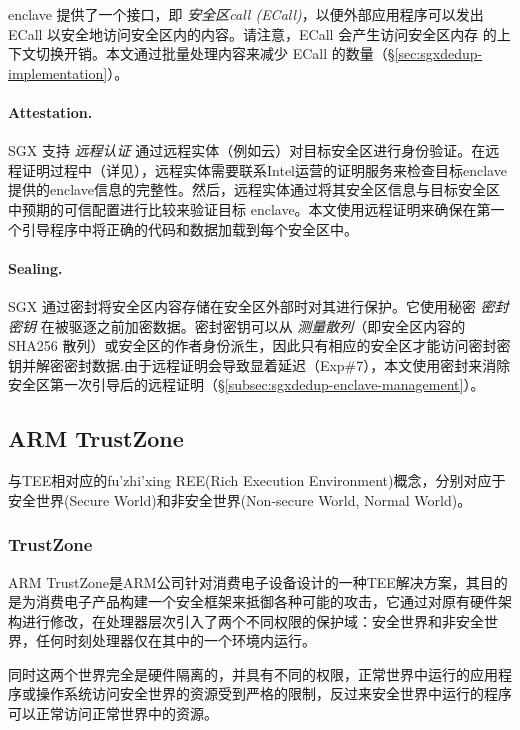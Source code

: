 enclave 提供了一个接口，即 \textit{安全区call (ECall)}，以便外部应用程序可以发出 ECall 以安全地访问安全区内的内容。请注意，ECall 会产生访问安全区内存 \cite{harnik18} 的上下文切换开销。本文通过批量处理内容来减少 ECall 的数量（\S\ref{sec:sgxdedup-implementation}）。

\paragraph*{Attestation.} SGX 支持 \textit{ 远程认证} 通过远程实体（例如云）对目标安全区进行身份验证。在远程证明过程中（详见\cite{sgx}），远程实体需要联系Intel运营的证明服务来检查目标enclave提供的enclave信息的完整性。然后，远程实体通过将其安全区信息与目标安全区中预期的可信配置进行比较来验证目标 enclave。本文使用远程证明来确保在第一个引导程序中将正确的代码和数据加载到每个安全区中。

\paragraph*{Sealing.} SGX 通过密封将安全区内容存储在安全区外部时对其进行保护。它使用秘密 \textit{ 密封密钥} 在被驱逐之前加密数据。密封密钥可以从 \textit{ 测量散列}（即安全区内容的 SHA256 散列）或安全区的作者身份派生，因此只有相应的安全区才能访问密封密钥并解密密封数据.由于远程证明会导致显着延迟（Exp\#7），本文使用密封来消除安全区第一次引导后的远程证明（\S\ref{subsec:sgxdedup-enclave-management}）。

\subsection{ARM TrustZone}
\label{subsec:background-tee-tz}

与TEE相对应的fu'zhi'xing REE(Rich Execution Environment)概念，分别对应于安全世界(Secure World)和非安全世界(Non-secure World, Normal World)。


\subsubsection{TrustZone}


ARM TrustZone是ARM公司针对消费电子设备设计的一种TEE解决方案，其目的是为消费电子产品构建一个安全框架来抵御各种可能的攻击，它通过对原有硬件架构进行修改，在处理器层次引入了两个不同权限的保护域：安全世界和非安全世界，任何时刻处理器仅在其中的一个环境内运行。

同时这两个世界完全是硬件隔离的，并具有不同的权限，正常世界中运行的应用程序或操作系统访问安全世界的资源受到严格的限制，反过来安全世界中运行的程序可以正常访问正常世界中的资源。

